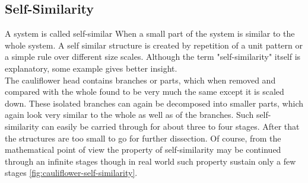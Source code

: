 	\subsection{Self-Similarity}
	A system is called self-similar	When a small part of the system is similar to the whole system. A self similar structure is created by repetition of a unit pattern or a simple rule over different size scales. Although the term "self-similarity" itself is explanatory, some example gives better insight. \\
	The cauliflower head contains branches or parts, which	when removed and compared with the whole found to be very much	the same except it is scaled down. These isolated branches can again	be decomposed into smaller parts, which again look very similar to the	whole as well as of the branches. Such self-similarity can easily be carried through for about three to four stages. After that the structures are	too small to go for further dissection. Of course, from the mathematical	point of view the property of self-similarity may be continued through	an infinite stages though in real world such property sustain only a few	stages \ref{fig:cauliflower-self-similarity}.
